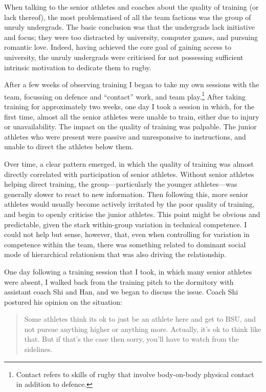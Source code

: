 \begin{CJK}{UTF8}{gbsn}
  When talking to the senior athletes and coaches about the quality of training (or lack thereof), the most problematised of all the team factions was the group of unruly undergrads.  The basic conclusion was that the undergrads lack initiative and focus; they were too distracted by university, computer games, and pursuing romantic love. Indeed, having achieved the core goal of gaining access to university, the unruly undergrads were criticised for not possessing sufficient intrinsic motivation to dedicate them to rugby.

  \myparagraph{}

  After a few weeks of observing training I began to take my own sessions with the team, focussing on defence and ``contact'' work, and team play.\footnote{Contact refers to skills of rugby that involve body-on-body physical contact in addition to defence.}  After taking training for approximately two weeks, one day I took a session in which, for the first time, almost all the senior athletes were unable to train, either due to injury or unavailability.  The impact on the quality of training was palpable.  The junior athletes who were present were passive and unresponsive to instructions, and unable to direct the athletes below them.

  Over time, a clear pattern emerged, in which the quality of training was almost directly correlated with participation of senior athletes. Without senior athletes helping direct training, the group---particularly the younger athletes---was generally slower to react to new information.  Then following this, more senior athletes would usually become actively irritated by the poor quality of training, and begin to openly criticise the junior athletes.  This point might be obvious and predictable, given the stark within-group variation in technical competence.  I could not help but sense, however, that, even when controlling for variation in competence within the team, there was something related to dominant social mode of hierarchical relationism that was also driving the relationship.

  One day following a training session that I took, in which many senior athletes were absent,  I walked back from the training pitch to the dormitory with assistant coach Shi and Han, and we began to discuss the issue. Coach Shi postured his opinion on the situation:

  \begin{quotation}
    Some athletes think its ok to just be an athlete here and get to BSU, and not pursue anything higher or anything more.  Actually, it's ok to think like that. But if that's the case then sorry, you'll have to watch from the sidelines.
  \end{quotation}



\end{CJK}
